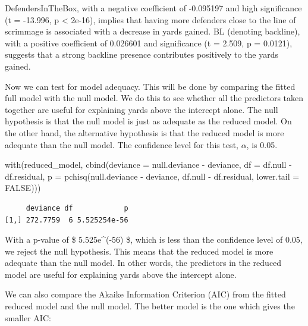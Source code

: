 \documentclass[
  super,
  preprint,
  3p]{elsarticle}
\newenvironment{Shaded}{\begin{snugshade}}{\end{snugshade}}
\newcommand{\AttributeTok}[1]{\textcolor[rgb]{0.40,0.45,0.13}{#1}}
\newcommand{\ConstantTok}[1]{\textcolor[rgb]{0.56,0.35,0.01}{#1}}
\newcommand{\FunctionTok}[1]{\textcolor[rgb]{0.28,0.35,0.67}{#1}}
\newcommand{\NormalTok}[1]{\textcolor[rgb]{0.00,0.23,0.31}{#1}}
\newcommand{\SpecialCharTok}[1]{\textcolor[rgb]{0.37,0.37,0.37}{#1}}
\begin{document}
DefendersInTheBox, with a negative coefficient of -0.095197 and high
significance (t = -13.996, p \textless{} 2e-16), implies that having
more defenders close to the line of scrimmage is associated with a
decrease in yards gained. BL (denoting backline), with a positive
coefficient of 0.026601 and significance (t = 2.509, p = 0.0121),
suggests that a strong backline presence contributes positively to the
yards gained.

Now we can test for model adequacy. This will be done by comparing the
fitted full model with the null model. We do this to see whether all the
predictors taken together are useful for explaining yards above the
intercept alone. The null hypothesis is that the null model is just as
adequate as the reduced model. On the other hand, the alternative
hypothesis is that the reduced model is more adequate than the null
model. The confidence level for this test, \(\alpha\), is 0.05.

\begin{Shaded}
\begin{Highlighting}[]
\FunctionTok{with}\NormalTok{(reduced\_model, }\FunctionTok{cbind}\NormalTok{(}\AttributeTok{deviance =}\NormalTok{ null.deviance }\SpecialCharTok{{-}}\NormalTok{ deviance, }
                      \AttributeTok{df =}\NormalTok{ df.null }\SpecialCharTok{{-}}\NormalTok{ df.residual,}
                      \AttributeTok{p =} \FunctionTok{pchisq}\NormalTok{(null.deviance }\SpecialCharTok{{-}}\NormalTok{ deviance, }
\NormalTok{                      df.null }\SpecialCharTok{{-}}\NormalTok{ df.residual, }
                      \AttributeTok{lower.tail =} \ConstantTok{FALSE}\NormalTok{)))}
\end{Highlighting}
\end{Shaded}

\begin{verbatim}
     deviance df            p
[1,] 272.7759  6 5.525254e-56
\end{verbatim}

With a p-value of \$ 5.525e\^{}(-56) \$, which is less than the
confidence level of 0.05, we reject the null hypothesis. This means that
the reduced model is more adequate than the null model. In other words,
the predictors in the reduced model are useful for explaining yards
above the intercept alone.

We can also compare the Akaike Information Criterion (AIC) from the
fitted reduced model and the null model. The better model is the one
which gives the smaller AIC:
\end{document}
